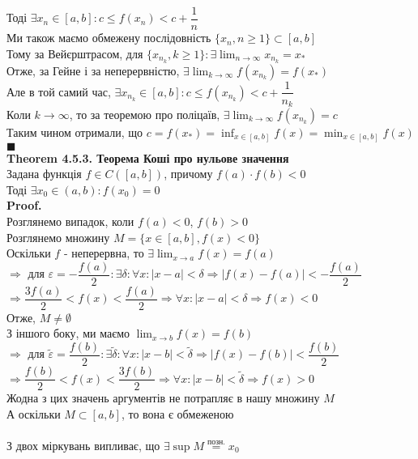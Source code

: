 \documentclass[a4paper, 14pt]{extarticle}
\def\huge{\displaystyle}
\def\bigline{\vspace{5mm}\\}
\def\th#1{\textbf{Theorem {#1}}}
\def\proof{\textbf{Proof.}\\}
\def\bigline{\vspace{5mm}\\}
\def\qed{$\blacksquare$}
\begin{document}
Тоді $\exists x_n \in [a,b]: c \leq f(x_n) < c + \dfrac{1}{n}$\\
Ми також маємо обмежену послідовність $\{x_n, n \geq 1\} \subset [a,b]$\\
Тому за Вейєрштрасом, для $\{x_{n_k},k \geq 1\}: \exists \huge \lim_{n \to \infty} x_{n_k} = x_*$\\
Отже, за Гейне і за неперервністю, $\huge \exists \lim_{k \to \infty} f(x_{n_k}) = f(x_*)$\\
Але в той самий час, $\exists x_{n_k} \in [a,b]: c \leq f(x_{n_k}) < c + \dfrac{1}{n_k}$\\
Коли $k \to \infty$, то за теоремою про поліцаїв, $\exists \huge \lim_{k \to \infty} f(x_{n_k}) = c$\\
Таким чином отримали, що $c = f(x_*) = \huge \inf_{x \in [a,b]} f(x) = \min_{x \in [a,b]} f(x)$ \qed
\bigline
\th{4.5.3. Теорема Коші про нульове значення}\\
Задана функція $f \in C([a,b])$, причому $f(a) \cdot f(b) < 0$\\
Тоді $\exists x_0 \in (a,b): f(x_0) = 0$\\
\proof
Розглянемо випадок, коли $f(a) < 0$, $f(b) > 0$\\
Розглянемо множину $M= \{x \in [a,b], f(x) < 0\}$\\
Оскільки $f$ - неперервна, то $\huge \exists \lim_{x \to a} f(x) = f(a)$\\
$\Rightarrow$ для $\varepsilon = -\dfrac{f(a)}{2}: \exists \delta: \forall x: |x-a|<\delta \Rightarrow |f(x)-f(a)|< -\dfrac{f(a)}{2}$\\
$\Rightarrow \dfrac{3f(a)}{2} < f(x) < \dfrac{f(a)}{2} \Rightarrow \forall x: |x-a|<\delta \Rightarrow f(x) < 0$\\
Отже, $M \neq \emptyset$\\
З іншого боку, ми маємо $\huge \lim_{x \to b} f(x) = f(b)$\\
$\Rightarrow$ для $\tilde{\varepsilon} = \dfrac{f(b)}{2}: \exists \tilde{\delta}: \forall x: |x-b| < \tilde{\delta} \Rightarrow |f(x)-f(b)|<\dfrac{f(b)}{2}$\\
$\Rightarrow \dfrac{f(b)}{2} < f(x) < \dfrac{3f(b)}{2} \Rightarrow \forall x: |x-b| < \tilde{\delta} \Rightarrow f(x) > 0$\\
Жодна з цих значень аргументів не потрапляє в нашу множину $M$\\
А оскільки $M \subset [a,b]$, то вона є обмеженою\\
\\
З двох міркувань випливає, що $\exists \sup M \overset{\textrm{позн.}}{=} x_0$\\
\end{document}
